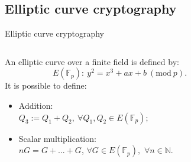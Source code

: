 \documentclass[slidescentered]{beamer}
\begin{document}
		\subsection{Elliptic curve cryptography}
		\begin{frame}{Elliptic curve cryptography}
			\begin{columns}
				\begin{column}{0.5\linewidth}
					An elliptic curve over a finite field is defined by: 
					$$E(\mathbb{F}_p): \ y^2 = x^3 + ax + b \ (\text{mod} \ p).$$
					It is possible to define:
					\begin{itemize}
						\item<2 -> Addition: \\
						$Q_3 := Q_1 + Q_2, \ \forall Q_1, Q_2 \in E(\mathbb{F}_p)$;
						\item<3 -> Scalar multiplication: \\
						$nG = G + ... + G$, $\forall G \in E(\mathbb{F}_p),$ $\forall n \in \mathbb{N}$.
					\end{itemize}
			\end{column}
			\begin{column}{0.6\linewidth}
			\end{column}
		\end{columns}
	\end{frame}
\end{document}
